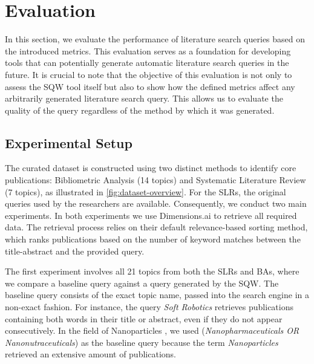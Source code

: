 {\let\clearpage\relax \chapter{Evaluation}\label{ch:eval}}
In this section, we evaluate the performance of literature search queries based on the introduced metrics. This evaluation serves as a foundation for developing tools that can potentially generate automatic literature search queries in the future. It is crucial to note that the objective of this evaluation is not only to assess the SQW tool itself but also to show how the defined metrics affect any arbitrarily generated literature search query. This allows us to evaluate the quality of the query regardless of the method by which it was generated.

\vspace*{.5cm}

\section{Experimental Setup}
The curated dataset is constructed using two distinct methods to identify core publications: Bibliometric Analysis (14 topics) and Systematic Literature Review (7 topics), as illustrated in \autoref{fig:dataset-overview}. For the SLRs, the original queries used by the researchers are available. Consequently, we conduct two main experiments. In both experiments we use Dimensions.ai to retrieve all required data. The retrieval process relies on their default relevance-based sorting method, which ranks publications based on the number of keyword matches between the title-abstract and the provided query.

The first experiment involves all 21 topics from both the SLRs and BAs, where we compare a baseline query against a query generated by the SQW. The baseline query consists of the exact topic name, passed into the search engine in a non-exact fashion. For instance, the query \textit{Soft Robotics} retrieves publications containing both words in their title or abstract, even if they do not appear consecutively. In the field of Nanoparticles \autocite{Yeung2020}, we used (\textit{Nanopharmaceuticals OR Nanonutraceuticals}) as the baseline query because the term \textit{Nanoparticles} retrieved an extensive amount of publications. 

